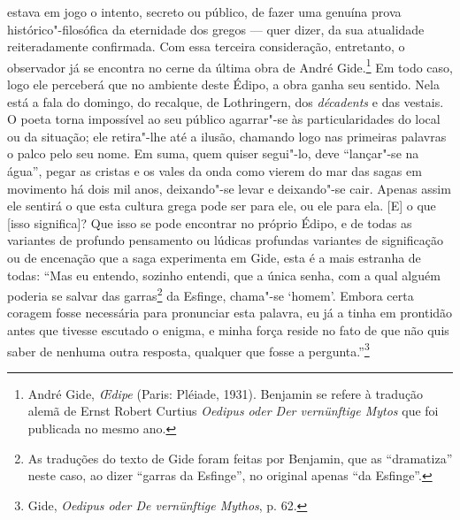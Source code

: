 estava em jogo o intento, secreto ou público, de fazer uma genuína prova
histórico"-filosófica da eternidade dos gregos --- quer dizer, da sua
atualidade reiteradamente confirmada. Com essa terceira consideração,
entretanto, o observador já se encontra no cerne da última obra de André
Gide.\footnote{André Gide, \emph{\OE dipe} (Paris: Pléiade, 1931).
  Benjamin se refere à tradução alemã de Ernst Robert Curtius
  \emph{Oedipus oder Der vernünftige Mytos} que foi publicada no mesmo
  ano. \versal{[N. T.]}} Em todo caso, logo ele perceberá que no ambiente deste Édipo, a
obra ganha seu sentido. Nela está a fala do domingo, do recalque, de
Lothringern, dos \emph{décadents} e das vestais. O poeta torna
impossível ao seu público agarrar"-se às particularidades do local ou da
situação; ele retira"-lhe até a ilusão, chamando logo nas primeiras
palavras o palco pelo seu nome. Em suma, quem quiser segui"-lo, deve
``lançar"-se na água'', pegar as cristas e os vales da onda como vierem
do mar das sagas em movimento há dois mil anos, deixando"-se levar e
deixando"-se cair. Apenas assim ele sentirá o que esta cultura grega pode
ser para ele, ou ele para ela. {[}E{]} o que {[}isso significa{]}? Que
isso se pode encontrar no próprio Édipo, e de todas as variantes de
profundo pensamento ou lúdicas profundas variantes de significação ou de
encenação que a saga experimenta em Gide, esta é a mais estranha de
todas: ``Mas eu entendo, sozinho entendi, que a única senha, com a qual
alguém poderia se salvar das garras\footnote{As traduções do texto
  de Gide foram feitas por Benjamin, que as ``dramatiza'' neste caso, ao
  dizer ``garras da Esfinge'', no original apenas ``da Esfinge''. \versal{[N. E.]}} da
Esfinge, chama"-se `homem'. Embora certa coragem fosse necessária para
pronunciar esta palavra, eu já a tinha em prontidão antes que tivesse
escutado o enigma, e minha força reside no fato de que não quis saber de
nenhuma outra resposta, qualquer que fosse a pergunta.''\footnote{Gide, \emph{Oedipus oder De vernünftige Mythos}, p. 62. \versal{[N. T.]}}

